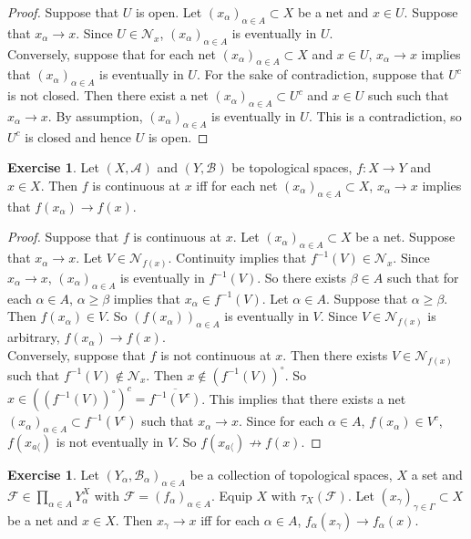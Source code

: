 \documentclass[12pt]{amsart}
\theoremstyle{definition}
\newtheorem{ex}[definition]{Exercise}
\newcommand{\al}{\alpha}
\newcommand{\gam}{\gamma}
\newcommand{\Gam}{\Gamma}
\newcommand{\be}{\beta}
\newcommand{\MA}{\mathcal{A}}
\newcommand{\MB}{\mathcal{B}}
\newcommand{\MF}{\mathcal{F}}
\newcommand{\MN}{\mathcal{N}}
\renewcommand{\l}{\langle}
\newcommand{\lex}[1]{\label{ex:#1}}
\begin{document}
	\begin{proof}
		Suppose that $U$ is open. Let $(x_{\al})_{\al \in A} \subset X$ be a net and $x \in U$. Suppose that $x_{\al} \rightarrow x$. Since $U \in \MN_x$, $(x_{\al})_{\al \in A}$ is eventually in $U$. \\
		Conversely, suppose that for each net $(x_{\al})_{\al \in A} \subset X$ and $x \in U$, $x_{\al} \rightarrow x$ implies that $(x_{\al})_{\al \in A} $ is eventually in $U$. For the sake of contradiction, suppose that $U^c$ is not closed. Then there exist a net $(x_{\al})_{\al \in A} \subset U^c$ and $x \in U$ such such that $x_{\al} \rightarrow x$. By assumption, $(x_{\al})_{\al \in A}$ is eventually in $U$. This is a contradiction, so $U^c$ is closed and hence $U$ is open. 
	\end{proof}
	
	\begin{ex} \lex{33010}
	Let $(X,\MA)$ and $(Y,\MB)$ be topological spaces, $f:X \rightarrow Y$ and $x \in X$. Then $f$ is continuous at $x$ iff for each net $(x_{\al})_{\al \in A} \subset X$, $x_{\al} \rightarrow x$ implies that $f(x_{\al}) \rightarrow f(x)$. 
	\end{ex}
	
	\begin{proof}
	Suppose that $f$ is continuous at $x$. Let $(x_{\al})_{\al \in A} \subset X$ be a net. Suppose that $x_{\al} \rightarrow x$. Let $V \in \MN_{f(x)}$. Continuity implies that $f^{-1}(V) \in \MN_{x}$. Since  $x_{\al} \rightarrow x$, $(x_{\al})_{\al \in A}$ is eventually in $f^{-1}(V)$. So there exists $\be \in A$ such that for each $\al \in A$, $\al \geq \be$ implies that $x_{\al} \in f^{-1}(V)$. Let $\al \in A$. Suppose that $\al \geq \be$. Then $f(x_{\al}) \in V$. So $(f(x_{\al}))_{\al \in A}$ is eventually in $V$. Since $V \in \MN_{f(x)}$ is arbitrary, $f(x_{\al}) \rightarrow f(x)$.\\
	Conversely, suppose that $f$ is not continuous at $x$. Then there exists $V \in \MN_{f(x)}$ such that $f^{-1}(V) \not \in \MN_x$. Then $x \not \in (f^{-1}(V))^{\circ}$. So $x \in ((f^{-1}(V))^{\circ})^c = \overline{f^{-1}(V^c)}$. This implies that there exists a net $(x_{\al})_{\al \in A} \subset f^{-1}(V^c)$ such that $x_{\al} \rightarrow x$. Since for each $\al \in A$, $f(x_{\al}) \in V^c$, $f(x_{a\l})$ is not eventually in $V$. So $f(x_{a\l}) \not \rightarrow f(x)$. 
\end{proof}		
	
	\begin{ex} \lex{33011}
	Let $(Y_{\al}, \MB_{\al})_{\al \in A}$ be a collection of topological spaces, $X$ a set and $\MF \in \prod \limits_{\al \in A}Y_{\al}^X$ with $\MF = (f_{\al})_{\al \in A}$. Equip $X$ with $\tau_X(\MF)$. Let $(x_{\gam})_{\gam \in \Gam} \subset X$ be a net and $x \in X$. Then $x_{\gam} \rightarrow x$ iff for each $\al \in A$, $f_{\al}(x_{\gam}) \rightarrow f_{\al}(x)$.  
	\end{ex}
	
\end{document}
